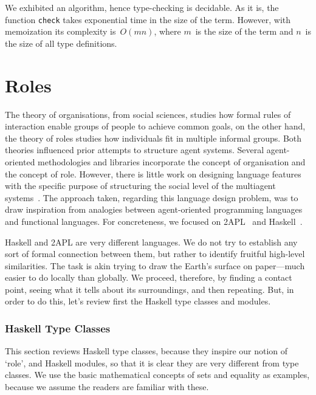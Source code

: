 \documentclass[a4paper,12pt,oneside,fleqn]{book} %
\newcommand{\rg}[1]{\marginpar{\tiny\raggedright\textcolor{blue}{\bf rg:} #1}}
\begin{document}
We exhibited an algorithm, hence type-checking is decidable. As it is, the
function \verb|check| takes exponential time in the size of the term.
However, with memoization its complexity is~$O(mn)$, where $m$~is the
size of the term and $n$~is the size of all type definitions.

\section{Roles} %
The theory of organisations, from social sciences, studies how formal rules
of interaction enable groups of people to achieve common goals, on the
other hand, the theory of roles studies how individuals fit in multiple
informal groups. Both theories influenced prior attempts to structure agent
systems. Several agent-oriented methodologies and libraries incorporate the
concept of organisation and the concept of role.  However, there is little
work on designing language features with the specific purpose of
structuring the social level of the multiagent
systems~\cite{collier2005,DBLP:journals/entcs/BaldoniBT06,DBLP:conf/oopsla/RicciS11}.
The approach taken, regarding this language design problem, was to draw
inspiration from analogies between agent-oriented programming languages and
functional languages. For concreteness, we focused on
2APL~\cite{DBLP:journals/aamas/Dastani08} and Haskell~\cite{web:haskell}.

Haskell and 2APL are very different languages. We do not try to establish
any sort of formal connection between them, but rather to identify fruitful
high-level similarities. The task is akin trying to draw the Earth's
surface on paper---much easier to do locally than globally. We proceed,
therefore, by finding a contact point, seeing what it tells about its
surroundings, and then repeating. But, in order to do this, let's review
first the Haskell type classes and modules.

\subsubsection{Haskell Type Classes} %

This section reviews Haskell type classes, because they inspire our notion
of `role', and Haskell modules, so that it is clear they are very different
from type classes. We use the basic mathematical concepts of sets and
equality as examples, because we assume the readers are familiar with these.
\end{document}
